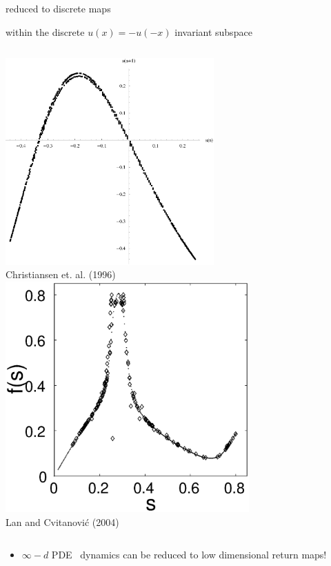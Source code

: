 \documentclass{beamer}
\begin{document}
\begin{frame}{{\KSf} reduced to discrete maps}
  \begin{block}{within the discrete $u(x) = -u(-x)$ invariant subspace}
  \begin{columns}
	\includegraphics[width=0.6\textwidth,clip=true]{../../figs/sPoincarePlot}\\
	Christiansen et. al. (1996)
	\includegraphics[width=0.7\textwidth,clip=true]{../../figs/lanRM}\\
	Lan and Cvitanovi\'c (2004)
 \end{columns}
 \end{block}

\medskip
\begin{itemize}
 \item<alert@2->
$\infty-d$ PDE \statesp\ dynamics can be reduced to low dimensional
return maps!

\end{itemize}

\end{frame}
\end{document}
